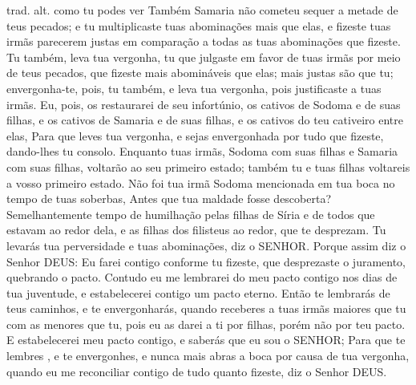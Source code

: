 {{trad. alt. como tu podes ver
}
Também Samaria não cometeu sequer a metade de teus pecados; e tu multiplicaste tuas abominações mais que elas, e fizeste tuas irmãs parecerem justas em comparação a todas as tuas abominações que fizeste.
Tu também, leva tua vergonha, tu que julgaste em favor de tuas irmãs por meio de teus pecados, que fizeste mais abomináveis que elas; mais justas são que tu; envergonha-te, pois, tu também, e leva tua vergonha, pois justificaste a tuas irmãs.
Eu, pois, os restaurarei de seu infortúnio, os cativos de Sodoma e de suas filhas, e os cativos de Samaria e de suas filhas, e os cativos do teu cativeiro entre elas,
Para que leves tua vergonha, e sejas envergonhada por tudo que fizeste, dando-lhes tu consolo.
Enquanto tuas irmãs, Sodoma com suas filhas e Samaria com suas filhas, voltarão ao seu primeiro estado; também tu e tuas filhas voltareis a vosso primeiro estado.
Não foi tua irmã Sodoma mencionada em tua boca no tempo de tuas soberbas,
Antes que tua maldade fosse descoberta? Semelhantemente
{} tempo de humilhação pelas filhas de Síria e de todos que estavam ao redor dela, e as filhas dos filisteus ao redor, que te desprezam.
Tu levarás
{} tua perversidade e tuas abominações, diz o SENHOR.
Porque assim diz o Senhor DEUS: Eu farei contigo conforme tu fizeste, que desprezaste o juramento, quebrando o pacto.
Contudo eu me lembrarei do meu pacto contigo nos dias de tua juventude, e estabelecerei contigo um pacto eterno.
Então te lembrarás de teus caminhos, e te envergonharás, quando receberes a tuas irmãs maiores que tu com as menores que tu, pois eu as darei a ti por filhas, porém não por teu pacto.
E estabelecerei meu pacto contigo, e saberás que eu sou o SENHOR;
Para que te lembres
{} , e te envergonhes, e nunca mais abras a boca por causa de tua vergonha, quando eu me reconciliar contigo de tudo quanto fizeste, diz o Senhor DEUS.

}
